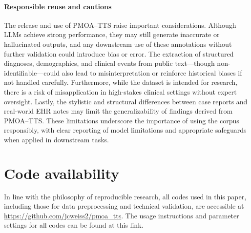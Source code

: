 \documentclass[pdflatex,sn-mathphys-num]{sn-jnl}%
\theoremstyle{thmstyleone}%
\theoremstyle{thmstyletwo}%
\theoremstyle{thmstylethree}%
\begin{document}
\paragraph{Responsible reuse and cautions}

The release and use of PMOA–TTS raise important considerations. Although LLMs achieve strong performance, they may still generate inaccurate or hallucinated outputs, and any downstream use of these annotations without further validation could introduce bias or error. The extraction of structured diagnoses, demographics, and clinical events from public text—though non-identifiable—could also lead to misinterpretation or reinforce historical biases if not handled carefully. Furthermore, while the dataset is intended for research, there is a risk of misapplication in high-stakes clinical settings without expert oversight. Lastly, the stylistic and structural differences between case reports and real-world EHR notes may limit the generalizability of findings derived from PMOA–TTS. These limitations underscore the importance of using the corpus responsibly, with clear reporting of model limitations and appropriate safeguards when applied in downstream tasks.


\section*{Code availability}\label{sec:data_availability}
In line with the philosophy of reproducible research, all codes used in this paper, including those for data preprocessing and technical validation, are accessible at \url{https://github.com/jcweiss2/pmoa_tts}. The usage instructions and parameter settings for all codes can be found at this link.



\clearpage
\appendix

\end{document}
